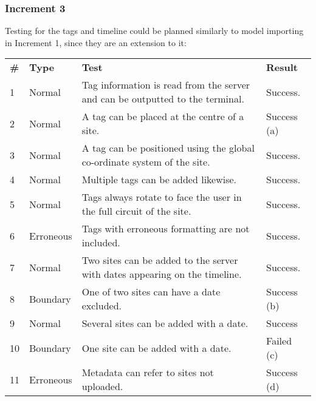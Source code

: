 \documentclass[12pt, a4paper]{article}
\begin{document}
\subsubsection{Increment 3}
Testing for the tags and timeline could be planned similarly to model importing in Increment 1, since they are an extension to it:
\begin{table}[H]
\footnotesize
\begin{tabular}{llll}
\textbf{\#} & \textbf{Type} & \textbf{Test}                                                              & \textbf{Result}                       \\
1 & Normal   & Tag information is read from the server and can be outputted to the terminal. & Success.                                       \\
2 & Normal   & A tag can be placed at the centre of a site.                                  & Success (a) \\
3          & Normal        & A tag can be positioned using the global co-ordinate system of the site.   & Success.                              \\
4          & Normal        & Multiple tags can be added likewise.                                       & Success.                              \\
5          & Normal        & Tags always rotate to face the user in the full circuit of the site.       & Success.                              \\
6          & Erroneous     & Tags with erroneous formatting are not included.                           & Success.                              \\
7          & Normal        & Two sites can be added to the server with dates appearing on the timeline. & Success.                              \\
8 & Boundary & One of two sites can have a date excluded.                                    & Success (b)     \\
9          & Normal        & Several sites can be added with a date.                                    & Success                               \\
10         & Boundary      & One site can be added with a date.                                         & Failed (c)                               \\
11         & Erroneous     & Metadata can refer to sites not uploaded.                                  & Success (d) \\

\end{tabular}
\end{table}
\end{document}

